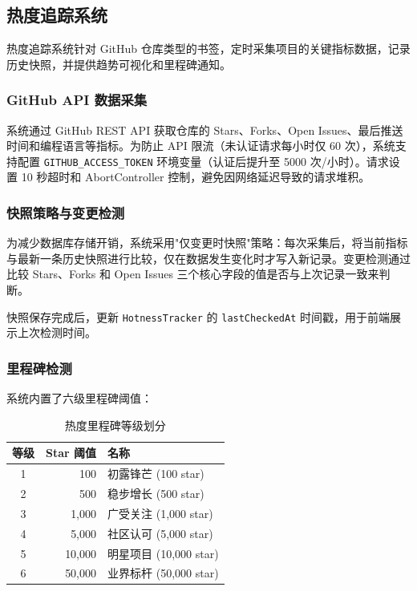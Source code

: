 \documentclass[12pt,a4paper]{ctexart}
\begin{document}
\subsection{热度追踪系统}

热度追踪系统针对 GitHub 仓库类型的书签，定时采集项目的关键指标数据，记录历史快照，并提供趋势可视化和里程碑通知。

\subsubsection{GitHub API 数据采集}

系统通过 GitHub REST API 获取仓库的 Stars、Forks、Open Issues、最后推送时间和编程语言等指标。为防止 API 限流（未认证请求每小时仅 60 次），系统支持配置 \texttt{GITHUB\_ACCESS\_TOKEN} 环境变量（认证后提升至 5000 次/小时）。请求设置 10 秒超时和 AbortController 控制，避免因网络延迟导致的请求堆积。

\subsubsection{快照策略与变更检测}

为减少数据库存储开销，系统采用"仅变更时快照"策略：每次采集后，将当前指标与最新一条历史快照进行比较，仅在数据发生变化时才写入新记录。变更检测通过比较 Stars、Forks 和 Open Issues 三个核心字段的值是否与上次记录一致来判断。

快照保存完成后，更新 \texttt{HotnessTracker} 的 \texttt{lastCheckedAt} 时间戳，用于前端展示上次检测时间。

\subsubsection{里程碑检测}

系统内置了六级里程碑阈值：

\begin{table}[H]
\centering
\caption{热度里程碑等级划分}
\label{tab:milestones}
\begin{tabular}{@{}crl@{}}
\toprule
\textbf{等级} & \textbf{Star 阈值} & \textbf{名称}          \\
\midrule
1 & 100    & 初露锋芒 (100 star)    \\
2 & 500    & 稳步增长 (500 star)    \\
3 & 1,000  & 广受关注 (1,000 star)  \\
4 & 5,000  & 社区认可 (5,000 star)  \\
5 & 10,000 & 明星项目 (10,000 star) \\
6 & 50,000 & 业界标杆 (50,000 star) \\
\bottomrule
\end{tabular}
\end{table}
\end{document}
